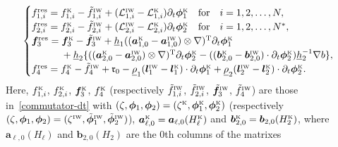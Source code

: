 \documentclass[11pt,leqno]{article}
\numberwithin{equation}{section}
\numberwithin{figure}{section}
\begin{document}
\[
\begin{cases}
 f_{1,i}^\mathrm{res}
  = f_{1,i}^{\mbox{\rm\tiny K}}-\tilde{f}_{1,i}^{\mbox{\rm\tiny IW}}
   + (\mathcal{L}_{1,i}^{\mbox{\rm\tiny IW}}-\mathcal{L}_{1,i}^{\mbox{\rm\tiny K}})\partial_t\bm{\phi}_1^{\mbox{\rm\tiny K}}
   \quad\mbox{for}\quad i=1,2,\ldots,N, \\
 f_{2,i}^\mathrm{res}
  = f_{2,i}^{\mbox{\rm\tiny K}}-\tilde{f}_{2,i}^{\mbox{\rm\tiny IW}}
   + (\mathcal{L}_{2,i}^{\mbox{\rm\tiny IW}}-\mathcal{L}_{2,i}^{\mbox{\rm\tiny K}})\partial_t\bm{\phi}_2^{\mbox{\rm\tiny K}}
   \quad\mbox{for}\quad i=1,2,\ldots,N^*, \\
 \bm{f}_3^\mathrm{res}
  = \bm{f}_3^{\mbox{\rm\tiny K}}-\tilde{\bm{f}}_3^{\mbox{\rm\tiny IW}}
   + \underline{h}_1((\bm{a}_{1,0}^{\mbox{\rm\tiny K}}-\bm{a}_{1,0}^{\mbox{\rm\tiny IW}})\otimes\nabla)^\mathrm{T}
    \partial_t \bm{\phi}_1^{\mbox{\rm\tiny K}} \\
 \qquad\quad{}
   + \underline{h}_2 \{((\bm{a}_{2,0}^{\mbox{\rm\tiny K}}-\bm{a}_{2,0}^{\mbox{\rm\tiny IW}})\otimes\nabla)^\mathrm{T}
    \partial_t \bm{\phi}_2^{\mbox{\rm\tiny K}} 
   - ((\bm{b}_{2,0}^{\mbox{\rm\tiny K}}-\bm{b}_{2,0}^{\mbox{\rm\tiny IW}})\cdot \partial_t \bm{\phi}_2^{\mbox{\rm\tiny K}})
    \underline{h}_2^{-1}\nabla b \}, \\
 f_4^\mathrm{res}
  = f_4^{\mbox{\rm\tiny K}}-\tilde{f}_4^{\mbox{\rm\tiny IW}}+\mathfrak{r}_0
   - \underline{\rho}_1(\bm{l}_1^{\mbox{\rm\tiny IW}}-\bm{l}_1^{\mbox{\rm\tiny K}})\cdot\partial_t\bm{\phi}_1^{\mbox{\rm\tiny K}}
   + \underline{\rho}_2(\bm{l}_2^{\mbox{\rm\tiny IW}}-\bm{l}_2^{\mbox{\rm\tiny K}})\cdot\partial_t\bm{\phi}_2^{\mbox{\rm\tiny K}}.
\end{cases}
\]
%
Here, $f_{1,i}^{\mbox{\rm\tiny K}}$, $f_{2,i}^{\mbox{\rm\tiny K}}$, $\bm{f}_3^{\mbox{\rm\tiny K}}$, $f_4^{\mbox{\rm\tiny K}}$ 
(respectively $\tilde{f}_{1,i}^{\mbox{\rm\tiny IW}}$, $\tilde{f}_{2,i}^{\mbox{\rm\tiny IW}}$, $\tilde{\bm{f}}_3^{\mbox{\rm\tiny IW}}$, 
 $\tilde{f}_4^{\mbox{\rm\tiny IW}}$) are those in~\eqref{commutator-dt} with $(\zeta,\bm{\phi}_1,\bm{\phi}_2) 
 =(\zeta^{\mbox{\rm\tiny K}},\bm{\phi}_1^{\mbox{\rm\tiny K}},\bm{\phi}_2^{\mbox{\rm\tiny K}})$ 
(respectively $(\zeta,\bm{\phi}_1,\bm{\phi}_2)
 =(\zeta^{\mbox{\rm\tiny IW}},\tilde{\bm{\phi}}_1^{\mbox{\rm\tiny IW}},\tilde{\bm{\phi}}_2^{\mbox{\rm\tiny IW}})$), 
$\bm{a}_{\ell,0}^{\mbox{\rm\tiny K}}=\bm{a}_{\ell,0}(H_\ell^{\mbox{\rm\tiny K}})$ and 
$\bm{b}_{2,0}^{\mbox{\rm\tiny K}}=\bm{b}_{2,0}(H_2^{\mbox{\rm\tiny K}})$, 
where $\bm{a}_{\ell,0}(H_\ell)$ and $\bm{b}_{2,0}(H_2)$ are the $0$th columns of the matrixes 
\end{document}
